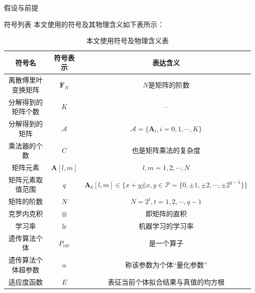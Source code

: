 \documentclass[11pt]{article}
\begin{document}
\begin{section}{假设与前提}
\begin{subsection}{符号列表}
   本文使用的符号及其物理含义如下表所示：\\
   \begin{table}[H]
     \centering
     \renewcommand{\arraystretch}{1.5}
     \caption{本文使用符号及物理含义表}
     \begin{tabular}{c|c|c}
       \hline
       符号名       & 符号表示              & 表达含义                                                                                \\
       \hline
       离散傅里叶变换矩阵 & $\mathbf{F}_N$    & $N$是矩阵的阶数                                                                           \\
       分解得到的矩阵个数 & $K$               & --                                                                                  \\
       分解得到的矩阵   & $\mathcal{A}$     & $\mathcal{A}=\{\mathbf{A}_i,i=0,1,\cdots,K\}$                                       \\
       乘法器的个数    & $C$               & 也是矩阵乘法的复杂度                                                                          \\
       矩阵元素      & $\mathbf{A}[l,m]$ & $l,m=1,2,\cdots,N$                                                                  \\
       矩阵元素取值范围  & $q$               & $\mathbf{A}_k[l,m]\in\{x+yj|x,y\in\mathcal{P}=\{0,\pm1,\pm2,\cdots,\pm 2^{q-1}\}\}$ \\
       矩阵的阶数     & $N$               & $N=2^t,t=1,2,\cdots,q-1$                                                            \\
       克罗内克积     & $\otimes$         & 即矩阵的直积                                                                              \\
       学习率       & lr                & 机器学习的学习率                                                                            \\
       遗传算法个体    & $P_{idv}$         & 是一个算子                                                                               \\
       遗传算法个体超参数 & $\alpha$          & 称该参数为个体“量化参数”                                                                       \\
       适应度函数     & $E$               & 表征当前个体拟合结果与真值的均方根                                                                   \\
       \hline
     \end{tabular}
     \label{table:本文使用符号及物理含义表}
   \end{table}


\end{subsection}
\end{section}
\end{document}
